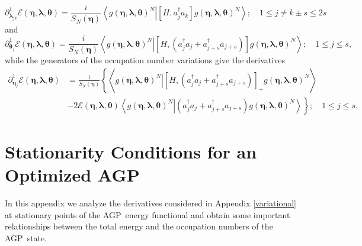 \documentclass[aps,preprint]{revtex4}%
\begin{document}
\begin{equation}
\partial_{\bm{\lambda}_{jk}}^{1}\mathcal{E}\left(
\bm{\eta },\bm{\lambda},\bm{\theta}\right)  =\frac{i}{S_{N}\left(
\bm{\eta}\right)  }\left\langle \left.  g\left(
\bm{\eta },\bm{\lambda},\bm{\theta}\right)  ^{N}\right\vert \left[
H,a_{j}^{\dagger}a_{k}\right]  g\left(
\bm{\eta},\bm{\lambda },\bm{\theta}\right)  ^{N}\right\rangle ;\quad1\leq
j\neq k\pm s\leq2s \label{Dlamda}%
\end{equation}
and
\begin{equation}
\partial_{\bm{\theta}_{j}}^{1}\mathcal{E}\left(
\bm{\eta },\bm{\lambda},\bm{\theta}\right)  =\frac{i}{S_{N}\left(
\bm{\eta}\right)  }\left\langle \left.  g\left(
\bm{\eta },\bm{\lambda},\bm{\theta}\right)  ^{N}\right\vert \left[  H,\left(
a_{j}^{\dagger}a_{j}+a_{j+s}^{\dagger}a_{j+s}\right)  \right]  g\left(
\bm{\eta},\bm{\lambda},\bm{\theta}\right)  ^{N}\right\rangle ;\quad1\leq j\leq
s, \label{Dtheta}%
\end{equation}
while the generators of the occupation number variations give the derivatives
\begin{align}
\partial_{\bm{\eta}_{j}}^{1}\mathcal{E}\left(
\bm{\eta},\bm{\lambda},\bm{\theta}\right)   &  =\frac{1}{S_{N}\left(
\bm{\eta}\right)  }\left\{  \left\langle \left.  g\left(
\bm{\eta },\bm{\lambda},\bm{\theta}\right)  ^{N}\right\vert \left[  H,\left(
a_{j}^{\dagger}a_{j}+a_{j+s}^{\dagger}a_{j+s}\right)  \right]  _{+}g\left(
\bm{\eta},\bm{\lambda},\bm{\theta}\right)  ^{N}\right\rangle \right.
\nonumber\\
&  -\left.  2\mathcal{E}\left(  \bm{\eta},\bm{\lambda},\bm{\theta }\right)
\left\langle \left.  g\left(  \bm{\eta},\bm{\lambda },\bm{\theta}\right)
^{N}\right\vert \left(  a_{j}^{\dagger}a_{j}+a_{j+s}^{\dagger}a_{j+s}\right)
g\left(  \bm{\eta},\bm{\lambda },\bm{\theta}\right)  ^{N}\right\rangle
\right\}  ;\quad1\leq j\leq s. \label{Deta}%
\end{align}


\section{Stationarity Conditions for an Optimized AGP\label{StatAGPCond}}

In this appendix we analyze the derivatives considered in Appendix
\ref{variational} at stationary points of the AGP\ energy functional and
obtain some important relationships between the total energy and the
occupation numbers of the AGP\ state.
\end{document}
